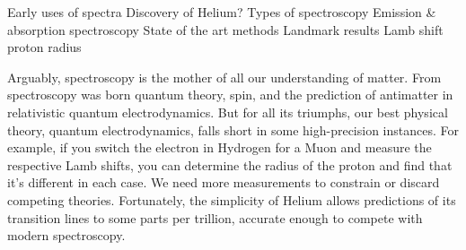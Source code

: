 Early uses of spectra Discovery of Helium? Types of spectroscopy
Emission \& absorption spectroscopy State of the art methods Landmark
results Lamb shift proton radius

Arguably, spectroscopy is the mother of all our understanding of matter.
	From spectroscopy was born quantum theory, spin, and the prediction of antimatter in relativistic quantum electrodynamics.
	But for all its triumphs, our best physical theory, quantum electrodynamics, falls short in some high-precision instances.
	For example, if you switch the electron in Hydrogen for a Muon and measure the respective Lamb shifts, you can determine the radius of the proton and find that it's different in each case.
	We need more measurements to constrain or discard competing theories.
	Fortunately, the simplicity of Helium allows predictions of its transition lines to some parts per trillion, accurate enough to compete with modern spectroscopy.

